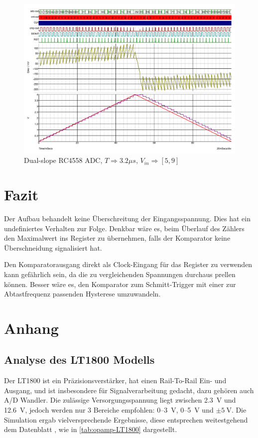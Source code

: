 \documentclass[
	ngerman,
	parskip=half,
	headsepline,
	twocolumn,
	DIV=calc,
	listof=leveldown,
	]{scrartcl}
\begin{document}
	
		\begin{figure}
			\centering
			\includegraphics[width=\linewidth]{RC4558_dual_slope}			
			\caption[Dual-slope RC4558 ADC]{Dual-slope RC4558 ADC, $T \Rightarrow 3.2\mu s$, $V_{in} \Rightarrow [5,  9]$}			
			\label{fig:dual-slope-RC4558}
		\end{figure}
	\section{Fazit}	
		
		Der Aufbau behandelt keine Überschreitung der Eingangsspannung.  Dies hat ein undefiniertes Verhalten zur Folge. Denkbar wäre es, beim Überlauf des Zählers den Maximalwert ins Register zu übernehmen, falls der Komparator keine Überschneidung signalisiert hat. 
		
		Den Komparatorausgang direkt als Clock-Eingang für das Register zu verwenden kann gefährlich sein, da die zu vergleichenden Spannungen durchaus prellen können. Besser wäre es, den Komparator zum Schmitt-Trigger mit einer zur Abtastfrequenz passenden Hysterese umzuwandeln.
		
	\section{Anhang}
	
	\subsection{Analyse des LT1800 Modells}
	\label{sec:appendix_LT1800_analysis}
	Der LT1800 ist ein Präzisionsverstärker, hat einen Rail-To-Rail Ein- und Ausgang, und ist insbesondere für Signalverarbeitung gedacht, dazu gehören auch A/D Wandler. Die zulässige Versorgungsspannung liegt zwischen \SI{2.3}{\volt} und \SI{12.6}{\volt}, jedoch werden nur 3 Bereiche empfohlen: 0--\SI{3}{\volt}, 0--\SI{5}{\volt}  und $\pm\SI{5}{\volt} $. Die Simulation ergab vielversprechende Ergebnisse, diese entsprechen weitestgehend dem Datenblatt \cite{datasheet:LT1800}, wie in \cref{tab:opamp-LT1800}  dargestellt.
	
\end{document}
